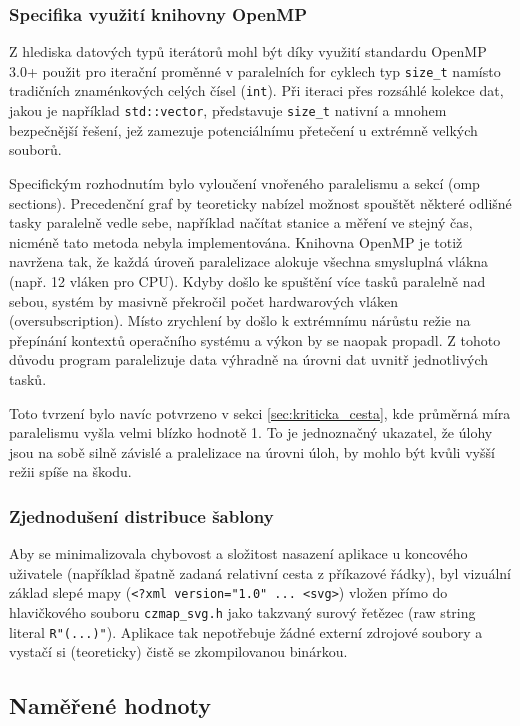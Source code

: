 \documentclass[10pt, a4paper]{report}
\begin{document}
	\subsubsection{Specifika využití knihovny OpenMP}
	
	Z hlediska datových typů iterátorů mohl být díky využití standardu OpenMP 3.0+ použit pro iterační proměnné v paralelních for cyklech typ \texttt{size\_t} namísto tradičních znaménkových celých čísel (\texttt{int}). Při iteraci přes rozsáhlé kolekce dat, jakou je například \texttt{std::vector}, představuje \texttt{size\_t} nativní a mnohem bezpečnější řešení, jež zamezuje potenciálnímu přetečení u extrémně velkých souborů.
	
	Specifickým rozhodnutím bylo vyloučení vnořeného paralelismu a sekcí (omp sections). Precedenční graf by teoreticky nabízel možnost spouštět některé odlišné tasky paralelně vedle sebe, například načítat stanice a měření ve stejný čas, nicméně tato metoda nebyla implementována. Knihovna OpenMP je totiž navržena tak, že každá úroveň paralelizace alokuje všechna smysluplná vlákna (např. 12 vláken pro CPU). Kdyby došlo ke spuštění více tasků paralelně nad sebou, systém by masivně překročil počet hardwarových vláken (oversubscription). Místo zrychlení by došlo k extrémnímu nárůstu režie na přepínání kontextů operačního systému a výkon by se naopak propadl. Z tohoto důvodu program paralelizuje data výhradně na úrovni dat uvnitř jednotlivých tasků.
	
	Toto tvrzení bylo navíc potvrzeno v sekci \ref{sec:kriticka_cesta}, kde průměrná míra paralelismu vyšla velmi blízko hodnotě 1. To je jednoznačný ukazatel, že úlohy jsou na sobě silně závislé a pralelizace na úrovni úloh, by mohlo být kvůli vyšší režii spíše na škodu.
	
	\subsubsection{Zjednodušení distribuce šablony}
	Aby se minimalizovala chybovost a složitost nasazení aplikace u koncového uživatele (například špatně zadaná relativní cesta z příkazové řádky), byl vizuální základ slepé mapy \linebreak (\texttt{<?xml version="1.0" ... <svg>}) vložen přímo do hlavičkového souboru \texttt{czmap\_svg.h} jako takzvaný surový řetězec (raw string literal \texttt{R"(...)"}). Aplikace tak nepotřebuje žádné externí zdrojové soubory a vystačí si (teoreticky) čistě se zkompilovanou binárkou.
	
	\subsection{Naměřené hodnoty}
	
\end{document}
